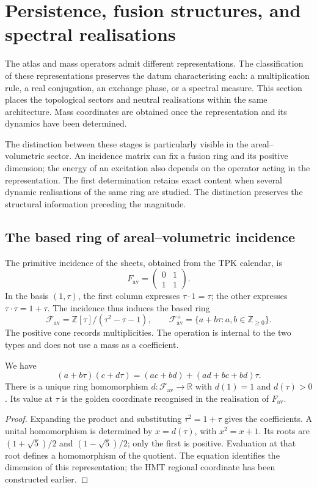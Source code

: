 \section{Persistence, fusion structures, and spectral realisations}
\label{vi:sec:topologia}

The atlas and mass operators admit different representations. The
classification of these representations preserves the datum characterising
each: a multiplication rule, a real conjugation, an exchange phase,
or a spectral measure. This section places the topological
sectors and neutral realisations within the same architecture.
Mass coordinates are obtained once the representation and its
dynamics have been determined.

The distinction between these stages is particularly visible in the
areal--volumetric sector. An incidence matrix can fix a fusion ring
and its positive dimension; the energy of an excitation also depends on the
operator acting in the representation. The first determination retains
exact content when several dynamic realisations of
the same ring are studied. The distinction preserves the structural information
preceding the magnitude.

\subsection{The based ring of areal--volumetric incidence}
\label{vi:subsec:fusion-av}

The primitive incidence of the sheets, obtained from the TPK calendar, is
\[
 F_{\mathrm{av}}=\begin{pmatrix}0&1\\1&1\end{pmatrix}.
\]
In the basis $(1,\tau)$, the first column expresses
$\tau\cdot1=\tau$; the other expresses $\tau\cdot\tau=1+\tau$.
The incidence thus induces the based ring
\[
 \mathcal F_{\mathrm{av}}=\mathbb Z[\tau]/(\tau^2-\tau-1),
 \qquad \mathcal F_{\mathrm{av}}^+
 =\{a+b\tau:a,b\in\mathbb Z_{\geq0}\}.
\]
The positive cone records multiplicities. The operation is internal to the
two types and does not use a mass as a coefficient.

\begin{proposition}
\label{vi:prop:fusion-av}
We have
\[
 (a+b\tau)(c+d\tau)
 =(ac+bd)+(ad+bc+bd)\tau.
\]
There is a unique ring homomorphism $d:\mathcal F_{\mathrm{av}}
\to\mathbb R$ with $d(1)=1$ and $d(\tau)>0$. Its value at $\tau$
is the golden coordinate recognised in the realisation of $F_{\mathrm{av}}$.
\end{proposition}
\begin{proof}
Expanding the product and substituting $\tau^2=1+\tau$ gives the coefficients.
A unital homomorphism is determined by $x=d(\tau)$, with
$x^2=x+1$. Its roots are $(1+\sqrt5)/2$ and $(1-\sqrt5)/2$;
only the first is positive. Evaluation at that root defines a
homomorphism of the quotient. The equation identifies the dimension of this
representation; the HMT regional coordinate has been constructed earlier.
\end{proof}

